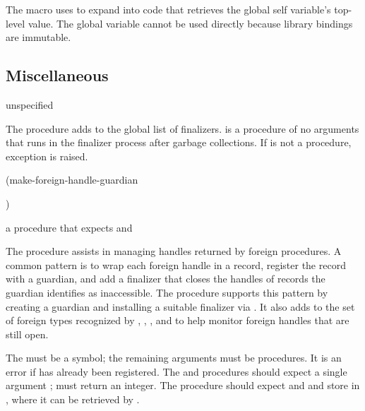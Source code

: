 The  macro uses  to expand into
code that retrieves the global self variable's top-level value. The
global variable cannot be used directly because library bindings are
immutable.

\subsection{Miscellaneous}

\begin{procedure}
\end{procedure}
\returns{} unspecified

The  procedure adds
 to the global list of finalizers.  is a
procedure of no arguments that runs in the finalizer process after
garbage collections. If  is not a procedure, exception
 is raised.

\begin{procedure}
\codebegin
(make-foreign-handle-guardian   \strut
                                )\strut
\codeend
\end{procedure}
\returns{} a procedure that expects  and 

The  procedure assists in managing handles
returned by foreign procedures.
A common pattern is to wrap each foreign handle in a record, register the
record with a guardian, and add a finalizer that closes the handles of records
the guardian identifies as inaccessible.
The  procedure supports this pattern
by creating a guardian and installing a suitable finalizer via .
It also adds  to the set of foreign types recognized by
,
,
, and
to help monitor foreign handles that are still open.

The  must be a symbol; the remaining arguments must be
procedures.  It is an error if  has already been registered.
The  and  procedures should expect a
single argument ;  must return an integer.
The  procedure should expect  and  and
store  in , where it can be retrieved by .

